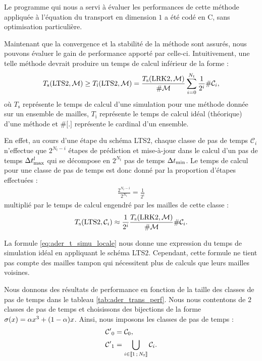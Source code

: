 \begin{remark}
	Le programme qui nous a servi à évaluer les performances de
	cette méthode appliquée à l'équation du transport en dimension $1$
	a été codé en C, sans optimisation particulière.
\end{remark}

Maintenant que la convergence et la stabilité de la méthode sont assurés,
nous pouvons évaluer le gain de performance apporté par celle-ci.
Intuitivement, une telle méthode devrait produire un temps de calcul
inférieur de la forme :
\begin{align}
	T_\mathrm{s}(\mathrm{LTS2},\mathcal{M}) \ge
	T_\mathrm{i}(\mathrm{LTS2},\mathcal{M}) = \frac{T_\mathrm{s}(\mathrm{LRK2},\mathcal{M})}{\#\mathcal{M}}
		\sum_{i=0}^{N_t} \frac{1}{2^i} \#\mathcal{C}_i ,
	\label{eq:ader_t_simu_locale}
\end{align}
où $T_\mathrm{s}$ représente le temps de calcul d'une simulation pour une méthode
donnée sur un ensemble de mailles,
$T_\mathrm{i}$ représente le temps de calcul idéal (théorique)
d'une méthode
et $\#\lbrack.\rbrack$ représente le cardinal d'un ensemble.

En effet, au cours d'une étape du schéma LTS$2$,
chaque classe de pas de temps $\mathcal{C}_i$ n'effectue que
$2^{N_t - i}$ étapes de prédiction et mise-à-jour dans le calcul
d'un pas de temps $\Delta t_{\max}^l$ qui se décompose en $2^{N_t}$ pas
de temps $\Delta t_{\min}$. Le temps de calcul pour une classe de pas de temps
est donc donné par la proportion d'étapes effectuées :
\begin{align}
	\frac{2^{N_t - i}}{2^{N_t}} = \frac{1}{2^i}
\end{align}
multiplié par le temps de calcul engendré par les mailles
de cette classe :
\begin{align}
	T_\mathrm{s}(\mathrm{LTS2},\mathcal{C}_i) \approx 
		\frac{1}{2^i} \frac{T_\mathrm{s}(\mathrm{LRK2},\mathcal{M})}{\#\mathcal{M}} \#\mathcal{C}_i .
\end{align}

La formule \eqref{eq:ader_t_simu_locale} nous donne une expression du
temps de simulation idéal en appliquant le schéma LTS$2$.
Cependant, cette formule ne tient pas compte des mailles tampon qui nécessitent
plus de calculs que leurs mailles voisines.

Nous donnons des résultats de performance en fonction de la taille des classes
de pas de temps dans le tableau \ref{tab:ader_trans_perf}.
Nous nous contentons de $2$ classes de pas de temps et choisissons des
bijections de la forme $\sigma(x) = \alpha x^3 + (1 - \alpha) x$.
Ainsi, nous imposons les classes de pas de temps :
\begin{subequations}
	\begin{align}
		{\mathcal{C}'}_0 &= \mathcal{C}_0 ,
		\\
		{\mathcal{C}'}_1 &= \bigcup_{i \in \lbrack\!\lbrack1\,;\,N_t\rbrack\!\rbrack} \mathcal{C}_i .
	\end{align}
\end{subequations}


